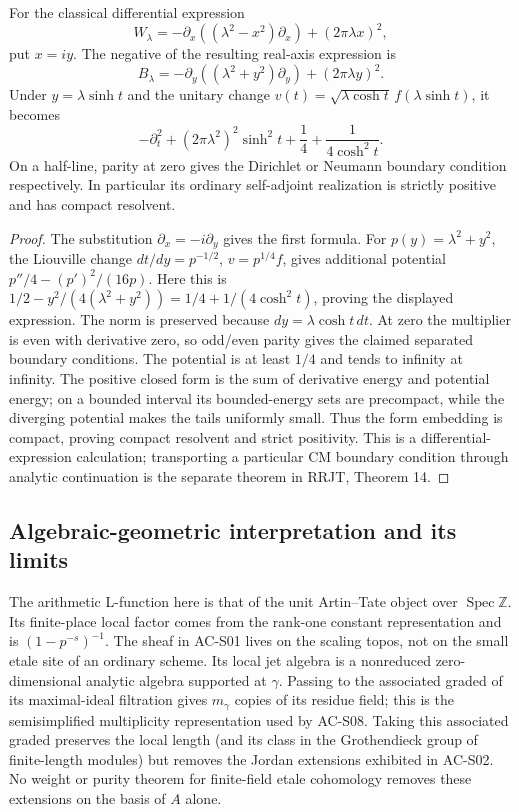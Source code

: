 \begin{proposition}
\label{AC-S12}
For the classical differential expression
\[
 W_\lambda=-\partial_x((\lambda^2-x^2)\partial_x)
                                  +(2\pi\lambda x)^2,
\]
put \(x=iy\).  The negative of the resulting real-axis expression
is
\[
 B_\lambda=-\partial_y((\lambda^2+y^2)\partial_y)
                                      +(2\pi\lambda y)^2.
\]
Under \(y=\lambda\sinh t\) and the unitary change
\(v(t)=\sqrt{\lambda\cosh t}\,f(\lambda\sinh t)\), it becomes
\[
 -\partial_t^2+(2\pi\lambda^2)^2\sinh^2t
                    +\frac14+\frac{1}{4\cosh^2t}.
\]
On a half-line, parity at zero gives the Dirichlet or Neumann boundary
condition respectively.  In particular its ordinary self-adjoint
realization is strictly positive and has compact resolvent.
\end{proposition}
\begin{proof}
The substitution \(\partial_x=-i\partial_y\) gives the first
formula.  For \(p(y)=\lambda^2+y^2\), the Liouville change
\(dt/dy=p^{-1/2}\), \(v=p^{1/4}f\), gives additional potential
\(p''/4-(p')^2/(16p)\).
Here this is
\(1/2-y^2/(4(\lambda^2+y^2))
 =1/4+1/(4\cosh^2t)\), proving the displayed expression.
The norm is preserved because \(dy=\lambda\cosh t\,dt\).
At zero the multiplier is even with derivative zero, so odd/even
parity gives the claimed separated boundary conditions.
The potential is at least \(1/4\) and tends to infinity at infinity.
The positive closed form is the sum of derivative energy and potential
energy; on a bounded interval its bounded-energy sets are precompact,
while the diverging potential makes the tails uniformly small.
Thus the form embedding is compact, proving compact resolvent and
strict positivity.  This is a differential-expression calculation;
transporting a particular CM boundary condition through analytic
continuation is the separate theorem in RRJT, Theorem 14.
\end{proof}

\subsection{Algebraic-geometric interpretation and its limits}

The arithmetic L-function here is that of the unit Artin--Tate object
over \(\operatorname{Spec}\mathbb Z\).  Its finite-place local factor
comes from the rank-one constant representation and is
\((1-p^{-s})^{-1}\).  The sheaf in AC-S01 lives on the scaling topos,
not on the small etale site of an ordinary scheme.  Its local jet
algebra is a nonreduced zero-dimensional analytic algebra supported
at \(\gamma\).  Passing to the associated graded of its maximal-ideal
filtration gives \(m_\gamma\) copies of its residue field; this is
the semisimplified multiplicity representation used by AC-S08.
Taking this associated graded preserves the local length (and its
class in the Grothendieck group of finite-length modules) but removes
the Jordan extensions exhibited in AC-S02.  No weight or purity
theorem for finite-field etale cohomology removes these extensions
on the basis of \(A\) alone.

